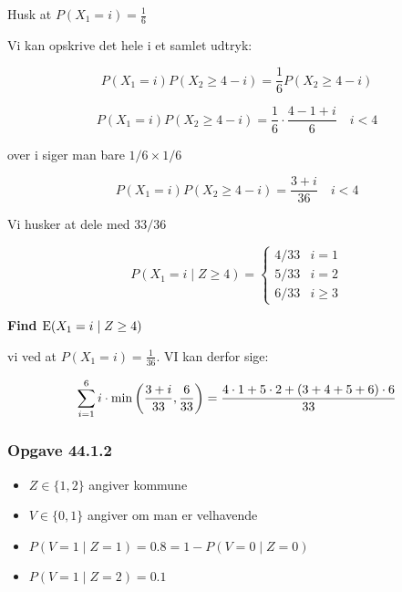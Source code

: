 Husk at $P(X_1 = i) = \frac{1}{6}$

Vi kan opskrive det hele i et samlet udtryk:

\begin{equation}
        P(X_1 = i)P(X_2 \geq 4 -i ) = \frac{1}{6}P(X_2 \geq 4 -i )
\end{equation}

\begin{equation}
    P(X_1 = i)P(X_2 \geq 4 -i ) = \frac{1}{6}\cdot \frac{4 - 1 + i}{6} \quad i<4
\end{equation}
    
over i siger man bare $1/6 \times 1/6$
    
\begin{equation}
    P(X_1 = i)P(X_2 \geq 4 -i ) = \frac{3+ i}{36} \quad i <4
\end{equation}

Vi husker at dele med $33/36$ 


\begin{equation}
    P(X_1 = i \mid Z \geq 4)=
        \begin{cases}
            4/33 &i=1 \\
            5/33 &i=2 \\
            6/33 &i\geq3
        \end{cases}
\end{equation}

\textbf{Find $\text{E}(X_1 = i  \mid Z \geq 4)$}

vi ved at $P(X_1 =i )= \frac{1}{36}$. VI kan derfor sige:

\begin{equation}
    \sum_{i=1}^6 i \cdot \min\left( \frac{3+i}{33}, \frac{6}{33} \right) = \frac{4\cdot 1 + 5 \cdot 2 + (3 + 4 + 5 +6)\cdot 6}{33}
\end{equation}

\subsubsection{Opgave 44.1.2}

\begin{itemize}
    \item $Z \in \{1, 2\}$ angiver kommune
    \item $V \in \{0, 1\}$ angiver om man er velhavende
    \item $P(V=1 \mid Z=1) = 0.8 = 1- P(V=0 \mid Z = 0)$
    \item $P(V=1 \mid Z=2) = 0.1$
\end{itemize}

